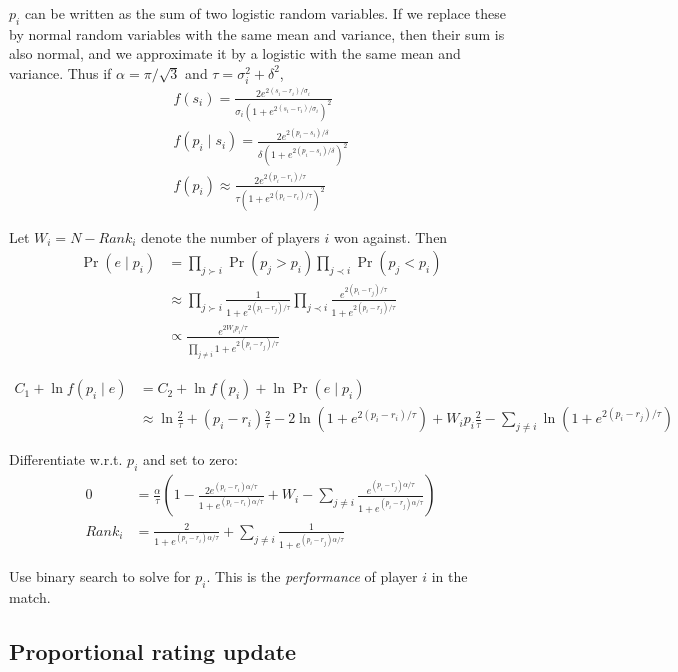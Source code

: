 \documentclass{article}
\begin{document}
$p_i$ can be written as the sum of two logistic random variables. If we replace these by normal random variables with the same mean and variance, then their sum is also normal, and we approximate it by a logistic with the same mean and variance. Thus if $\alpha = \pi/\sqrt{3}$ and $\tau = \sigma_i^2 + \delta^2$,
\begin{align}
f(s_i) = \frac { 2e^{2(s_i-r_i)/\sigma_i} } { \sigma_i\left(1 + e^{2(s_i-r_i)/\sigma_i} \right)^2 }
\\f(p_i\mid s_i) = \frac { 2e^{2(p_i-s_i)/\delta} } { \delta\left(1 + e^{2(p_i-s_i)/\delta} \right)^2}
\\f(p_i) \approx \frac { 2e^{2(p_i-r_i)/\tau} } { \tau\left(1 + e^{2(p_i-r_i)/\tau} \right)^2}
\end{align}

Let $W_i = N - Rank_i$ denote the number of players $i$ won against. Then
\begin{align}
\Pr(e\mid p_i) &= \prod_{j \succ i} \Pr(p_j > p_i) \prod_{j \prec i} \Pr(p_j < p_i)
\\&\approx \prod_{j \succ i} \frac {1} {1 + e^{2(p_i-r_j)/\tau}} \prod_{j \prec i} \frac {e^{2(p_i-r_j)/\tau}} {1 + e^{2(p_i-r_j)/\tau}}
\\&\propto \frac {e^{2W_ip_i/\tau}} {\prod_{j\neq i} 1 + e^{2(p_i-r_j)/\tau}}
\end{align}

\begin{align}
C_1 + \ln f(p_i\mid e) &= C_2 + \ln f(p_i) + \ln \Pr(e\mid p_i)
\\&\approx \ln \frac{2}{\tau} + (p_i-r_i)\frac{2}{\tau} - 2\ln\left(1 + e^{2(p_i-r_i)/\tau} \right) + W_ip_i\frac{2}{\tau} - \sum_{j\neq i} \ln\left(1 + e^{2(p_i-r_j)/\tau}\right)
\end{align}

Differentiate w.r.t. $p_i$ and set to zero:
\begin{align}
0 &= \frac{\alpha}{\tau} \left( 1 - \frac {2e^{(p_i-r_i)\alpha/\tau}} {1 + e^{(p_i-r_i)\alpha/\tau}} + W_i - \sum_{j\neq i} \frac {e^{(p_i-r_j)\alpha/\tau}} {1 + e^{(p_i-r_j)\alpha/\tau}} \right)
\\Rank_i &= \frac {2} {1 + e^{(p_i-r_i)\alpha/\tau}} + \sum_{j\neq i} \frac {1} {1 + e^{(p_i-r_j)\alpha/\tau}}
\end{align}

Use binary search to solve for $p_i$. This is the \emph{performance} of player $i$ in the match.

\subsection{Proportional rating update}
\end{document}

